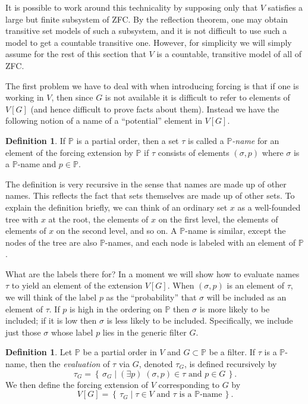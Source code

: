 \documentclass[11pt,oneside]{amsbook}
\newcommand{\set}[1]{\left\{\,#1\,\right\}}
\newcommand{\PP}{\mathbb P}
\theoremstyle{definition}
\theoremstyle{plain}
\theoremstyle{definition}
\newtheorem{definition}[theorem]{Definition}
\theoremstyle{remark}
\numberwithin{equation}{section}
\numberwithin{figure}{section}
\begin{document}
It is possible to work around this technicality by supposing only that $V$ satisfies a large but finite subsystem of ZFC. By the reflection theorem, one may obtain transitive set models of such a subsystem, and it is not difficult to use such a model to get a countable transitive one. However, for simplicity we will simply assume for the rest of this section that $V$ is a countable, transitive model of all of ZFC.


The first problem we have to deal with when introducing forcing is that if one is working in $V$, then since $G$ is not available it is difficult to refer to elements of $V[G]$ (and hence difficult to prove facts about them). Instead we have the following notion of a name of a ``potential'' element in $V[G]$.

\begin{definition}
  If $\PP$ is a partial order, then a set $\tau$ is called a \emph{$\PP$-name} for an element of the forcing extension by $\mathbb P$ if $\tau$ consists of elements $(\sigma,p)$ where $\sigma$ is a \emph{$\PP$}-name and $p\in\PP$.
\end{definition}

The definition is very recursive in the sense that names are made up of other names. This reflects the fact that sets themselves are made up of other sets. To explain the definition briefly, we can think of an ordinary set $x$ as a well-founded tree with $x$ at the root, the elements of $x$ on the first level, the elements of elements of $x$ on the second level, and so on. A $\PP$-name is similar, except the nodes of the tree are also $\PP$-names, and each node is labeled with an element of $\PP$. 

What are the labels there for? In a moment we will show how to evaluate names $\tau$ to yield an element of the extension $V[G]$. When $(\sigma,p)$ is an element of $\tau$, we will think of the label $p$ as the ``probability'' that $\sigma$ will be included as an element of $\tau$. If $p$ is high in the ordering on $\PP$ then $\sigma$ is more likely to be included; if it is low then $\sigma$ is less likely to be included. Specifically, we include just those $\sigma$ whose label $p$ lies in the generic filter $G$.

\begin{definition}
  Let $\PP$ be a partial order in $V$ and $G\subset\PP$ be a filter. If $\tau$ is a $\PP$-name, then the \emph{evaluation} of $\tau$ via $G$, denoted $\tau_G$, is defined recursively by
  \[\tau_G=\set{\sigma_G\mid (\exists p)\;(\sigma,p)\in\tau\text{ and }p\in G}\text{.}
  \]
  We then define the forcing extension of $V$ corresponding to $G$ by
  \[V[G]=\set{\tau_G\mid\text{$\tau\in V$ and $\tau$ is a $\PP$-name}}\text{.}
  \]
\end{definition}
\end{document}
